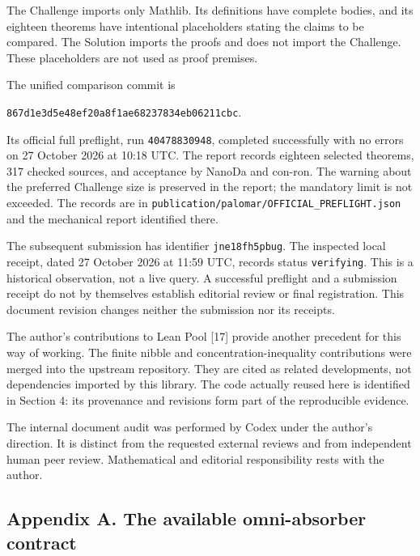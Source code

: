 \documentclass[english,11pt,a4paper]{article}
\begin{document}
The Challenge imports only Mathlib. Its definitions have complete bodies, and its eighteen theorems have intentional placeholders stating the claims to be compared. The Solution imports the proofs and does not import the Challenge. These placeholders are not used as proof premises.

The unified comparison commit is

\texttt{867d1e3d\allowbreak{}5e48ef20\allowbreak{}a8f1ae68\allowbreak{}237834eb\allowbreak{}06211cbc}.

Its official full preflight, run \texttt{40478830948}, completed successfully with no errors on 27 October 2026 at 10:18 UTC. The report records eighteen selected theorems, 317 checked sources, and acceptance by NanoDa and con-ron. The warning about the preferred Challenge size is preserved in the report; the mandatory limit is not exceeded. The records are in \texttt{publication/\allowbreak{}palomar/\allowbreak{}OFFICIAL\_\allowbreak{}PREFLIGHT.\allowbreak{}json} and the mechanical report identified there.

The subsequent submission has identifier \texttt{jne18fh5pbug}. The inspected local receipt, dated 27 October 2026 at 11:59 UTC, records status \texttt{verifying}. This is a historical observation, not a live query. A successful preflight and a submission receipt do not by themselves establish editorial review or final registration. This document revision changes neither the submission nor its receipts.

The author's contributions to Lean Pool {[}17{]} provide another precedent for this way of working. The finite nibble and concentration-inequality contributions were merged into the upstream repository. They are cited as related developments, not dependencies imported by this library. The code actually reused here is identified in Section 4: its provenance and revisions form part of the reproducible evidence.

The internal document audit was performed by Codex under the author's direction. It is distinct from the requested external reviews and from independent human peer review. Mathematical and editorial responsibility rests with the author.

\subsection{Appendix A. The available omni-absorber contract}\label{appendix-a.-the-available-omni-absorber-contract}
\end{document}
